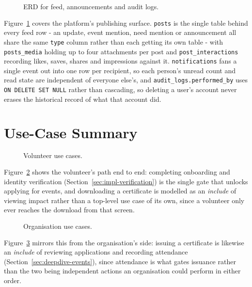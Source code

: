 \begin{figure}[H]
    \centering
    \caption{ERD for feed, announcements and audit logs.}
    \label{fig:erd-engagement-b}
\end{figure}
\clearpage
\noindent Figure~\ref{fig:erd-engagement-b} covers the platform's publishing surface. \texttt{posts} is the single table behind every feed row - an update, event mention, need mention or announcement all share the same \texttt{type} column rather than each getting its own table - with \texttt{posts\_media} holding up to four attachments per post and \texttt{post\_interactions} recording likes, saves, shares and impressions against it. \texttt{notifications} fans a single event out into one row per recipient, so each person's unread count and read state are independent of everyone else's, and \texttt{audit\_logs.performed\_by} uses \texttt{ON DELETE SET NULL} rather than cascading, so deleting a user's account never erases the historical record of what that account did.


\section{Use-Case Summary}


\begin{figure}[H]
    \centering
    \caption{Volunteer use cases.}
    \label{fig:use-case-volunteer}
\end{figure}

\noindent Figure~\ref{fig:use-case-volunteer} shows the volunteer's path end to end: completing onboarding and identity verification (Section~\ref{sec:impl-verification}) is the single gate that unlocks applying for events, and downloading a certificate is modelled as an \emph{include} of viewing impact rather than a top-level use case of its own, since a volunteer only ever reaches the download from that screen.

\begin{figure}[H]
    \centering
    \caption{Organisation use cases.}
    \label{fig:use-case-org}
\end{figure}

\noindent Figure~\ref{fig:use-case-org} mirrors this from the organisation's side: issuing a certificate is likewise an \emph{include} of reviewing applications and recording attendance (Section~\ref{sec:deepdive-events}), since attendance is what gates issuance rather than the two being independent actions an organisation could perform in either order.

